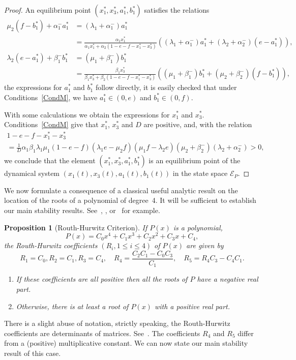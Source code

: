 \documentclass[english]{amsart}
\newcommand{\cal}[1]{\ensuremath{\mathcal{#1}}}
\newtheorem{proposition}{Proposition}
\numberwithin{proposition}{section}
\begin{document}
\begin{proof}
An equilibrium point $(x_1^*,x_3^*,a_1^*,b_1^*)$  satisfies the relations
\begin{align*}
\mu_2(f{-}b_1^*){+}\alpha_1^-a_1^*&=(\lambda_1{+}\alpha_1^-)a_1^*\\ &=\frac{\alpha_1x_1^*}{\alpha_1 x_1^*+  \alpha_2 (1{-}e{-}f{-}x_1^*{-}x_3^*)}((\lambda_1{+}\alpha_1^-) a_1^*+  (\lambda_2 {+}\alpha_2^-)(e{-}a_1^*)),\\
\lambda_2 (e-a_1^*){+}\beta_1^-b_1^*&=(\mu_1{+}\beta_1^-)b_1^*\\ &=\frac{\beta_1x_3^*}{\beta_1 x_3^*+  \beta_2 (1{-}e{-}f{-}x_1^*{-}x_3^*)}((\mu_1{+}\beta_1^-) b_1^*+  (\mu_2{+}\beta_2^-) (f{-}b_1^*)),
\end{align*}
the expressions for $a_1^*$ and $b_1^*$ follow directly, it is easily checked that  under Conditions~\eqref{CondM}, we have $a_1^*{\in}(0,e)$ and $b_1^*{\in}(0,f)$.

With some calculations we obtain the expressions for  $x_1^*$ and  $x_3^*$.  Conditions~\eqref{CondM} give that $x_1^*$, $x_3^*$ and $D$ are positive,  and, with  the relation
 \begin{multline*}
1{-}e{-}f{-}x_1^*{-}x_3^*\\=\frac{1}{D}\alpha_1  \beta_1  \lambda_1  \mu_1  \left(1{-}e {-}f\right) \left(\lambda_1e  {-}\mu_2f  \right)\left( \mu_1f{-}\lambda_2 e \right) \left(\mu_2  {+}\beta_2^{-} \right) \left(\lambda_2  {+}\alpha_2^{-} \right) >0,
 \end{multline*}
we conclude that the  element $(x_1^*,x_3^*,a_1^*,b_1^*)$ is  an equilibrium point  of the dynamical system $(x_1(t),x_3(t),a_1(t),b_1(t))$ in the state space ${\cal E}_P$.
\end{proof}
We now formulate a consequence of a classical useful analytic result on the location of the  roots of a polynomial of degree~4. It will be sufficient to establish our main stability results. See~\citet{Parks}, \citet{Gantmacher}, or~\citet{Fadali} for example. 

\begin{proposition}[Routh-Hurwitz Criterion]\label{RHCrit}
If $P(x)$ is a polynomial,
\[
P(x)=C_0x^4+C_1x^3+C_2x^2+C_3x+C_4,
\]
the Routh-Hurwitz coefficients $(R_i,1{\le}i{\le}4)$ of $P(x)$ are given by
\[
R_1=C_0, R_2=C_1, R_3=C_4,\quad
R_4=\frac{C_2C_1{-}C_0C_3}{C_1},\quad 
R_5=R_4C_3{-}C_4C_1.
\]
\begin{enumerate}
\item If these coefficients are all positive then all the roots of $P$ have a negative real part.
\item Otherwise, there is at least  a root of $P(x)$ with a positive real part.
\end{enumerate}
\end{proposition}
There is a slight abuse of notation, strictly speaking, the Routh-Hurwitz coefficients are determinants of matrices. See~\citet{Gantmacher}. The coefficients $R_4$ and $R_5$ differ from a (positive) multiplicative constant. We can now state our main stability result of this case. 
\end{document}
